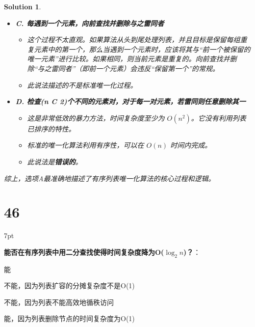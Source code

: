 \documentclass[UTF8]{report}
\newtheorem{solution}{Solution}
\theoremstyle{MyLineTheoremStyle} %
\theoremstyle{MyBlockTheoremStyle} %
\theoremstyle{MySubsubsectionStyle} %
\newenvironment{graybox}{%
        \def\FrameCommand{%
        \hspace{1pt}%
        {\color{gray}\small \vrule width 2pt}%
        {\color{graybox_color}\vrule width 4pt}%
        \colorbox{graybox_color}%
        }%
        \MakeFramed{\advance\hsize-\width\FrameRestore}%
        \noindent\hspace{-4.55pt}%
        \begin{adjustwidth}{}{7pt}%
        \vspace{2pt}\vspace{2pt}%
        }
        {%
        \vspace{2pt}\end{adjustwidth}\endMakeFramed%
        }
\begin{document}
\begin{solution}
\begin{itemize}
    \item \textbf{C. 每遇到一个元素，向前查找并删除与之雷同者}
    \begin{itemize}
        \item 这个过程不太直观。如果算法从头到尾处理列表，并且目标是保留每组重复元素中的第一个，那么当遇到一个元素时，应该将其与“前一个被保留的唯一元素”进行比较。如果相同，则当前元素是重复的。向前查找并删除“与之雷同者”（即前一个元素）会违反“保留第一个”的常规。
        \item 此说法描述的不是标准唯一化过程。
    \end{itemize}

    \item \textbf{D. 检查(n C 2)个不同的元素对，对于每一对元素，若雷同则任意删除其一}
    \begin{itemize}
        \item 这是非常低效的暴力方法，时间复杂度至少为 $O(n^2)$。它没有利用列表已排序的特性。
        \item 标准的唯一化算法利用有序性，可以在 $O(n)$ 时间内完成。
        \item 此说法是\textbf{错误的}。
    \end{itemize}
\end{itemize}
综上，选项A最准确地描述了有序列表唯一化算法的核心过程和逻辑。
\end{solution}


\section*{46}

\begin{graybox}
\textbf{能否在有序列表中用二分查找使得时间复杂度降为O($\log_{2}n$)？}：
\begin{circledenum}
    \item 能
    \item 不能，因为列表扩容的分摊复杂度不是O(1)
    \item 不能，因为列表不能高效地循秩访问
    \item 能，因为列表删除节点的时间复杂度为O(1)
\end{circledenum}
\end{graybox}
\end{document}
